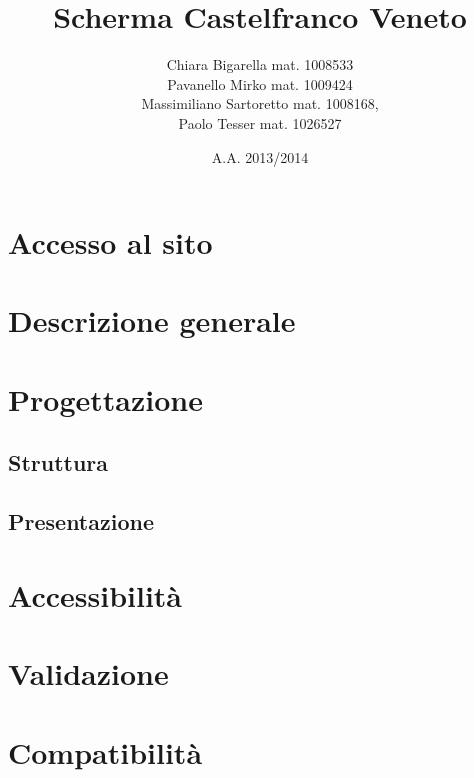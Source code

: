 
	
\title{\bfseries Scherma Castelfranco Veneto}
\author{Chiara Bigarella mat. 1008533\\Pavanello Mirko mat. 1009424 \\Massimiliano Sartoretto mat. 1008168,\\ Paolo Tesser mat. 1026527}
\date{A.A. 2013/2014}



\pagestyle{romano}
\newpage
	\tableofcontents
\newpage
	\listoffigures
\newpage
{}
\pagestyle{std}


\newpage
\section{Accesso al sito}
	

\newpage
\section{Descrizione generale}
	
	
\newpage
\section{Progettazione}
	\subsection{Struttura}
		
	\subsection{Presentazione}
		
\newpage
\section{Accessibilit\`a}
		

\newpage
\section{Validazione}
		

\newpage
\section{Compatibilit\`a}
	


